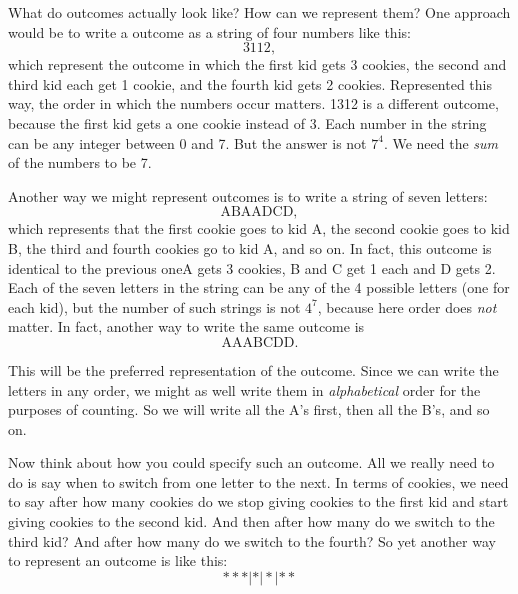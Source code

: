 \documentclass[10pt,]{book}
\theoremstyle{plain}
\theoremstyle{definition}
\theoremstyle{definition}
\theoremstyle{definition}
\numberwithin{equation}{section}
\begin{document}
What do outcomes actually look like? How can we represent them? One approach would be to write a outcome as a string of four numbers like this:
\begin{equation*}
  3112,
\end{equation*}
which represent the outcome in which the first kid gets 3 cookies, the second and third kid each get 1 cookie, and the fourth kid gets 2 cookies. Represented this way, the order in which the numbers occur matters. 1312 is a different outcome, because the first kid gets a one cookie instead of 3. Each number in the string can be any integer between 0 and 7. But the answer is not \(7^4\). We need the \emph{sum} of the numbers to be 7.
%
\par

Another way we might represent outcomes is to write a string of seven letters:
\begin{equation*}
  \mbox{ABAADCD} ,
\end{equation*}
which represents that the first cookie goes to kid A, the second cookie goes to kid B, the third and fourth cookies go to kid A, and so on. In fact, this outcome is identical to the previous one\textemdash{}A gets 3 cookies, B and C get 1 each and D gets 2. Each of the seven letters in the string can be any of the 4 possible letters (one for each kid), but the number of such strings is not \(4^7\), because here order does \emph{not} matter. In fact, another way to write the same outcome is
\begin{equation*}
  \mbox{AAABCDD} .
\end{equation*}
%
\par

This will be the preferred representation of the outcome. Since we can write the letters in any order, we might as well write them in \emph{alphabetical} order for the purposes of counting. So we will write all the A's first, then all the B's, and so on.
%
\par

Now think about how you could specify such an outcome. All we really need to do is say when to switch from one letter to the next. In terms of cookies, we need to say after how many cookies do we stop giving cookies to the first kid and start giving cookies to the second kid. And then after how many do we switch to the third kid? And after how many do we switch to the fourth? So yet another way to represent an outcome is like this:
\begin{equation*}
  ***|*|*|**
\end{equation*}
%
\par
\end{document}
